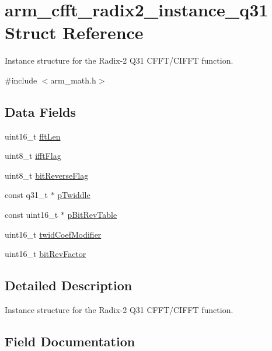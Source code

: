 \hypertarget{structarm__cfft__radix2__instance__q31}{}\section{arm\+\_\+cfft\+\_\+radix2\+\_\+instance\+\_\+q31 Struct Reference}
\label{structarm__cfft__radix2__instance__q31}


Instance structure for the Radix-\/2 Q31 C\+F\+F\+T/\+C\+I\+F\+FT function.  




{\ttfamily \#include $<$arm\+\_\+math.\+h$>$}

\subsection*{Data Fields}
\begin{DoxyCompactItemize}
\item 
uint16\+\_\+t \mbox{\hyperlink{structarm__cfft__radix2__instance__q31_ab8db3bbe7c61e6bb8ca2a55e3446e11a}{fft\+Len}}
\item 
uint8\+\_\+t \mbox{\hyperlink{structarm__cfft__radix2__instance__q31_ad6ca6e223f986ebfd94c5ee1e410aa73}{ifft\+Flag}}
\item 
uint8\+\_\+t \mbox{\hyperlink{structarm__cfft__radix2__instance__q31_a09a221a818c6d0e064557a99e2fe9a8b}{bit\+Reverse\+Flag}}
\item 
const q31\+\_\+t $\ast$ \mbox{\hyperlink{structarm__cfft__radix2__instance__q31_a9760c603af5d85652496dbffd63a8a2e}{p\+Twiddle}}
\item 
const uint16\+\_\+t $\ast$ \mbox{\hyperlink{structarm__cfft__radix2__instance__q31_a3b229432d381b0a511a9cdbe3aa74e78}{p\+Bit\+Rev\+Table}}
\item 
uint16\+\_\+t \mbox{\hyperlink{structarm__cfft__radix2__instance__q31_afe772e5b5001c9d8e85032115a8df5bf}{twid\+Coef\+Modifier}}
\item 
uint16\+\_\+t \mbox{\hyperlink{structarm__cfft__radix2__instance__q31_a33386d95319dc3ee7097b3a8e52e01ec}{bit\+Rev\+Factor}}
\end{DoxyCompactItemize}


\subsection{Detailed Description}
Instance structure for the Radix-\/2 Q31 C\+F\+F\+T/\+C\+I\+F\+FT function. 

\subsection{Field Documentation}
\mbox{\label{structarm__cfft__radix2__instance__q31_a09a221a818c6d0e064557a99e2fe9a8b}} 
